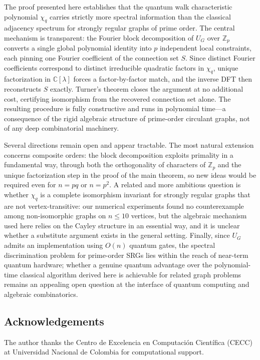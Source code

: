 \documentclass[12pt]{article}
\newcommand{\Z}{\mathbb{Z}}
\newcommand{\C}{\mathbb{C}}
\begin{document}
The proof presented here establishes that the quantum walk characteristic
polynomial $\chi_q$ carries strictly more spectral information than the
classical adjacency spectrum for strongly regular graphs of prime order.
The central mechanism is transparent: the Fourier block decomposition of
$U_G$ over $\Z_p$ converts a single global polynomial identity into $p$
independent local constraints, each pinning one Fourier coefficient of the
connection set $S$.  Since distinct Fourier coefficients correspond to
distinct irreducible quadratic factors in $\chi_q$, unique factorization in
$\C[\lambda]$ forces a factor-by-factor match, and the inverse DFT then
reconstructs $S$ exactly.  Turner's theorem closes the argument at no
additional cost, certifying isomorphism from the recovered connection set
alone.  The resulting procedure is fully constructive and runs in polynomial
time---a consequence of the rigid algebraic structure of prime-order
circulant graphs, not of any deep combinatorial machinery.

Several directions remain open and appear tractable.  The most natural
extension concerns composite orders: the block decomposition exploits
primality in a fundamental way, through both the orthogonality of
characters of $\Z_p$ and the unique factorization step in the proof of the
main theorem, so new ideas would be required even for $n = pq$ or $n =
p^2$.  A related and more ambitious question is whether $\chi_q$ is a
complete isomorphism invariant for strongly regular graphs that are not
vertex-transitive: our numerical experiments found no counterexample among
non-isomorphic graphs on $n \leq 10$ vertices, but the algebraic mechanism
used here relies on the Cayley structure in an essential way, and it is
unclear whether a substitute argument exists in the general setting.
Finally, since $U_G$ admits an implementation using $O(n)$ quantum gates,
the spectral discrimination problem for prime-order SRGs lies within the
reach of near-term quantum hardware; whether a genuine quantum advantage
over the polynomial-time classical algorithm derived here is achievable for
related graph problems remains an appealing open question at the interface
of quantum computing and algebraic combinatorics.

\subsection*{Acknowledgements}

The author thanks the Centro de Excelencia en Computaci\'on Cient\'ifica
(CECC) at Universidad Nacional de Colombia for computational support.
\end{document}
